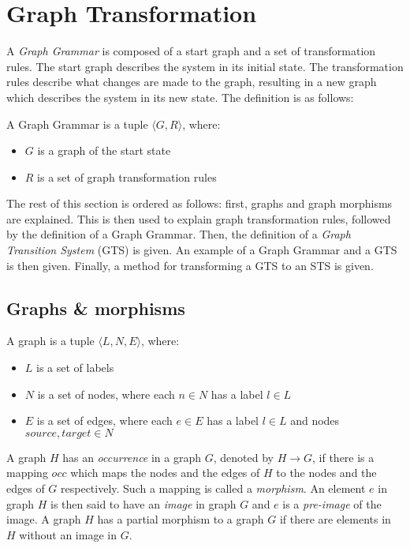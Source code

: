 \section{Graph Transformation}\label{sec:graph}
A \textit{Graph Grammar} is composed of a start graph and a set of transformation rules. The start graph describes the system in its initial state. The transformation rules describe what changes are made to the graph, resulting in a new graph which describes the system in its new state. The definition is as follows:
\\
\begin{definition}
A Graph Grammar is a tuple $\langle G, R\rangle$, where:
\begin{itemize}
  \item $G$ is a graph of the start state
  \item $R$ is a set of graph transformation rules
\end{itemize}
\end{definition} 

The rest of this section is ordered as follows: first, graphs and graph morphisms are explained. This is then used to explain graph transformation rules, followed by the definition of a Graph Grammar. Then, the definition of a \textit{Graph Transition System} (GTS) is given. An example of a Graph Grammar and a GTS is then given. Finally, a method for transforming a GTS to an STS is given.

\subsection{Graphs \& morphisms}
\begin{definition}
A graph is a tuple $\langle L, N, E\rangle$, where:
\begin{itemize}
  \item $L$ is a set of labels
  \item $N$ is a set of nodes, where each $n \in N$ has a label $l \in L$
  \item $E$ is a set of edges, where each $e \in E$ has a label $l \in L$ and nodes $source,target \in N$
\end{itemize}
\end{definition}

A graph $H$ has an \textit{occurrence} in a graph $G$, denoted by $H \rightarrow G$, if there is a mapping $occ$ which maps the nodes and the edges of $H$ to the nodes and the edges of $G$ respectively. Such a mapping is called a \textit{morphism}. An element $e$ in graph $H$ is then said to have an \textit{image} in graph $G$ and $e$ is a \textit{pre-image} of the image. A graph $H$ has a partial morphism to a graph $G$ if there are elements in $H$ without an image in $G$.

